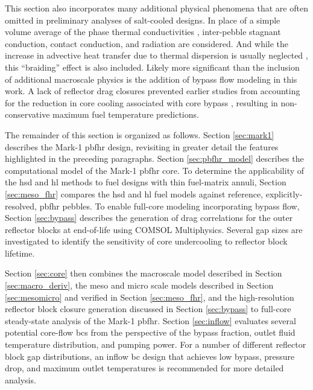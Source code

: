 This section also incorporates many additional physical phenomena that are often omitted in preliminary analyses of salt-cooled designs. In place of a simple volume average of the phase thermal conductivities \cite{xin_wang_thesis,scarlat}, inter-pebble stagnant conduction, contact conduction, and radiation are considered. And while the increase in advective heat transfer due to thermal dispersion is usually neglected \cite{xin_wang_thesis,scarlat}, this ``braiding'' effect is also included. Likely more significant than the inclusion of additional macroscale physics is the addition of bypass flow modeling in this work. A lack of reflector drag closures prevented earlier studies from accounting for the reduction in core cooling associated with core bypass \cite{xin_wang_thesis,scarlat}, resulting in non-conservative maximum fuel temperature predictions.

The remainder of this section is organized as follows. Section \ref{sec:mark1} describes the Mark-1 \gls{pbfhr} design, revisiting in greater detail the features highlighted in the preceding paragraphs. Section \ref{sec:pbfhr_model} describes the computational model of the Mark-1 \gls{pbfhr} core. To determine the applicability of the \gls{hsd} and \gls{hl} methods to fuel designs with thin fuel-matrix annuli, Section \ref{sec:meso_fhr} compares the \gls{hsd} and \gls{hl} fuel models against reference, explicitly-resolved, \gls{pbfhr} pebbles. To enable full-core modeling incorporating bypass flow, Section \ref{sec:bypass} describes the generation of drag correlations for the outer reflector blocks at end-of-life using COMSOL Multiphysics. Several gap sizes are investigated to identify the sensitivity of core undercooling to reflector block lifetime. 

Section \ref{sec:core} then combines the macroscale model described in Section \ref{sec:macro_deriv}, the meso and micro scale models described in Section \ref{sec:mesomicro} and verified in Section \ref{sec:meso_fhr}, and the high-resolution reflector block closure generation discussed in Section \ref{sec:bypass} to full-core steady-state analysis of the Mark-1 \gls{pbfhr}. Section \ref{sec:inflow} evaluates several potential core-flow \glspl{bc} from the perspective of the bypass fraction, outlet fluid temperature distribution, and pumping power. For a number of different reflector block gap distributions, an inflow \gls{bc} design that achieves low bypass, pressure drop, and maximum outlet temperatures is recommended for more detailed analysis.

